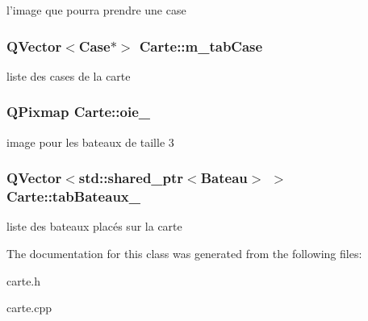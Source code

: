 l'image que pourra prendre une case \hypertarget{classCarte_adb0cda59419437b3c29b4b6e7abbbbf5}{
\subsubsection[{m\+\_\+tab\+Case}]{\setlength{\rightskip}{0pt plus 5cm}Q\+Vector$<${\bf Case}$\ast$$>$ Carte\+::m\+\_\+tab\+Case\hspace{0.3cm}{\ttfamily [protected]}}}\label{classCarte_adb0cda59419437b3c29b4b6e7abbbbf5}
liste des cases de la carte \hypertarget{classCarte_ac66303b2e5f99770c450993f45b9ebc2}{
\subsubsection[{oie\+\_\+}]{\setlength{\rightskip}{0pt plus 5cm}Q\+Pixmap Carte\+::oie\+\_\+\hspace{0.3cm}{\ttfamily [protected]}}}\label{classCarte_ac66303b2e5f99770c450993f45b9ebc2}
image pour les bateaux de taille 3 \hypertarget{classCarte_a5551a4561583b6536efe31b8de645f60}{
\subsubsection[{tab\+Bateaux\+\_\+}]{\setlength{\rightskip}{0pt plus 5cm}Q\+Vector$<$std\+::shared\+\_\+ptr$<${\bf Bateau}$>$ $>$ Carte\+::tab\+Bateaux\+\_\+\hspace{0.3cm}{\ttfamily [protected]}}}\label{classCarte_a5551a4561583b6536efe31b8de645f60}
liste des bateaux placés sur la carte 

The documentation for this class was generated from the following files\+:\begin{DoxyCompactItemize}
\item 
carte.\+h\item 
carte.\+cpp\end{DoxyCompactItemize}
